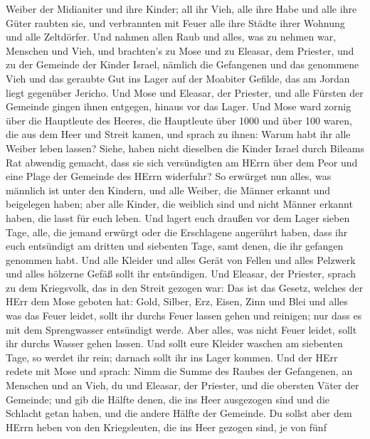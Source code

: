 Weiber der Midianiter und ihre Kinder; all ihr Vieh, alle ihre Habe und
alle ihre Güter raubten sie,  und verbrannten mit Feuer
alle ihre Städte ihrer Wohnung und alle Zeltdörfer.  Und
nahmen allen Raub und alles, was zu nehmen war, Menschen und Vieh,
 und brachten's zu Mose und zu Eleasar, dem Priester, und
zu der Gemeinde der Kinder Israel, nämlich die Gefangenen und das
genommene Vieh und das geraubte Gut ins Lager auf der Moabiter Gefilde,
das am Jordan liegt gegenüber Jericho.  Und Mose und
Eleasar, der Priester, und alle Fürsten der Gemeinde gingen ihnen
entgegen, hinaus vor das Lager.  Und Mose ward zornig über
die Hauptleute des Heeres, die Hauptleute über 1000 und über 100 waren,
die aus dem Heer und Streit kamen,  und sprach zu ihnen:
Warum habt ihr alle Weiber leben lassen?  Siehe, haben
nicht dieselben die Kinder Israel durch Bileams Rat abwendig gemacht,
dass sie sich versündigten am HErrn über dem Peor und eine Plage der
Gemeinde des HErrn widerfuhr?  So erwürget nun alles, was
männlich ist unter den Kindern, und alle Weiber, die Männer erkannt und
beigelegen haben;  aber alle Kinder, die weiblich sind und
nicht Männer erkannt haben, die lasst für euch leben.  Und
lagert euch draußen vor dem Lager sieben Tage, alle, die jemand erwürgt
oder die Erschlagene angerührt haben, dass ihr euch entsündigt am
dritten und siebenten Tage, samt denen, die ihr gefangen genommen habt.
 Und alle Kleider und alles Gerät von Fellen und alles
Pelzwerk und alles hölzerne Gefäß sollt ihr entsündigen. 
Und Eleasar, der Priester, sprach zu dem Kriegsvolk, das in den Streit
gezogen war: Das ist das Gesetz, welches der HErr dem Mose geboten hat:
 Gold, Silber, Erz, Eisen, Zinn und Blei  und
alles was das Feuer leidet, sollt ihr durchs Feuer lassen gehen und
reinigen; nur dass es mit dem Sprengwasser entsündigt werde. Aber alles,
was nicht Feuer leidet, sollt ihr durchs Wasser gehen lassen.
 Und sollt eure Kleider waschen am siebenten Tage, so
werdet ihr rein; darnach sollt ihr ins Lager kommen.  Und
der HErr redete mit Mose und sprach:  Nimm die Summe des
Raubes der Gefangenen, an Menschen und an Vieh, du und Eleasar, der
Priester, und die obersten Väter der Gemeinde;  und gib die
Hälfte denen, die ins Heer ausgezogen sind und die Schlacht getan haben,
und die andere Hälfte der Gemeinde.  Du sollst aber dem
HErrn heben von den Kriegsleuten, die ins Heer gezogen sind, je von fünf
